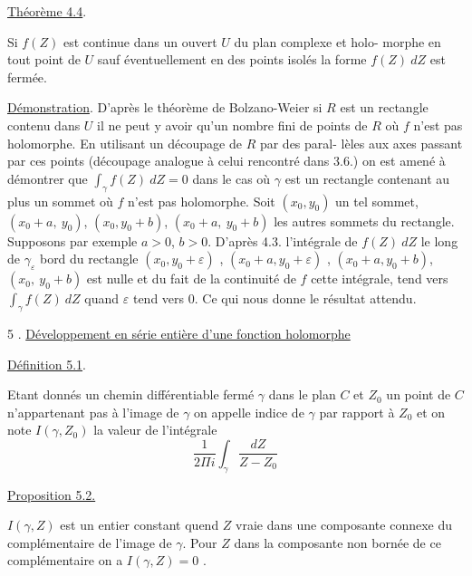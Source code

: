 
\uline{Théorème 4.4}.

Si $f(Z)$ est continue dans un ouvert $U$ du plan complexe et holo-%
morphe en tout point de $U$ sauf éventuellement en des points isolés la forme
$f(Z)\ dZ$ est fermée.

\uline{Démonstration}. D'après le théorème de Bolzano-Weier si $R$ est un
rectangle contenu dans $U$ il ne peut y avoir qu'un nombre fini de points de
$R$ où $f$ n'est pas holomorphe. En utilisant un découpage de $R$ par des paral-%
lèles aux axes passant par ces points (découpage analogue à celui rencontré
dans 3.6.) on est amené à démontrer que $\int_{\gamma} f(Z)\ dZ = 0$ dans le cas où $\gamma$
est un rectangle contenant au plus un sommet où $f$ n'est pas holomorphe. Soit
$(x_0,y_0)$ un tel sommet, $(x_0+a,\ y_0)$, $(x_0,y_0+b)$, $(x_0+a,\ y_0+b)$ les autres sommets
du rectangle. Supposons par exemple $a > 0$, $b > 0$. D'après 4.3. l'intégrale
de $f(Z)\ dZ$ le long de $\gamma_{\varepsilon}$ bord du rectangle $(x_0,y_0+\varepsilon)$ , $(x_0+a,y_0+\varepsilon)$ ,
$(x_0+a,y_0+b)$, $(x_0,\ y_0+b)$ est nulle et du fait de la continuité de $f$ cette
intégrale, tend vers $\int_{\gamma} f(Z)\ dZ$ quand $\varepsilon$ tend vers 0. Ce qui nous donne le
résultat attendu.

5 . \uline{Développement en série entière d'une fonction holomorphe}

\uline{Définition 5.1}.

Etant donnés un chemin différentiable fermé $\gamma$ dans le plan $C$ et
$Z_0$ un point de $C$ n'appartenant pas à l'image de $\gamma$ on appelle indice de $\gamma$
par rapport à $Z_0$ et on note $I(\gamma,Z_0)$ la valeur de l'intégrale
\[ \frac{1}{2\Pi i} \int_{\gamma} \frac{dZ}{Z-Z_0} \]

\uline{Proposition 5.2.}

$I(\gamma,Z)$ est un entier constant quend $Z$ vraie dans une composante
connexe du complémentaire de l'image de $\gamma$. Pour $Z$ dans la composante non
bornée de ce complémentaire on a $I(\gamma,Z) = 0$ .

